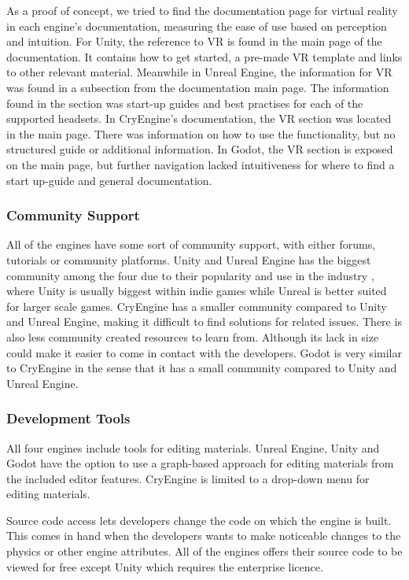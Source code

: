 As a proof of concept, we tried to find the documentation page for virtual reality in each engine's documentation, measuring the ease of use based on perception and intuition. For Unity, the reference to VR is found in the main page of the documentation. It contains how to get started, a pre-made VR template and links to other relevant material. Meanwhile in Unreal Engine, the information for VR was found in a subsection from the documentation main page. The information found in the section was start-up guides and best practises for each of the supported headsets. In CryEngine's documentation, the VR section was located in the main page. There was information on how to use the functionality, but no structured guide or additional information. In Godot, the VR section is exposed on the main page, but further navigation lacked intuitiveness for where to find a start up-guide and general documentation. 



\subsubsection{Community Support}
All of the engines have some sort of community support, with either forums, tutorials or community platforms. Unity and Unreal Engine has the biggest community among the four due to their popularity and use in the industry \cite{buckley_2022}, where Unity is usually biggest within indie games while Unreal is better suited for larger scale games. \cite{evercast}
CryEngine has a smaller community compared to Unity and Unreal Engine, making it difficult to find solutions for related issues. There is also less community created resources to learn from. Although its lack in size could make it easier to come in contact with the developers. \cite{cryengine_dealessandri_2020}
Godot is very similar to CryEngine in the sense that it has a small community compared to Unity and Unreal Engine. 
\cite{godot_dealessandri_2020}

\subsubsection{Development Tools}
All four engines include tools for editing materials. Unreal Engine, Unity and Godot have the option to use a graph-based approach for editing materials from the included editor features. CryEngine is limited to a drop-down menu for editing materials.

Source code access lets developers change the code on which the engine is built. This comes in hand when the developers wants to make noticeable changes to the physics or other engine attributes. All of the engines offers their source code to be viewed for free except Unity which requires the enterprise licence.

